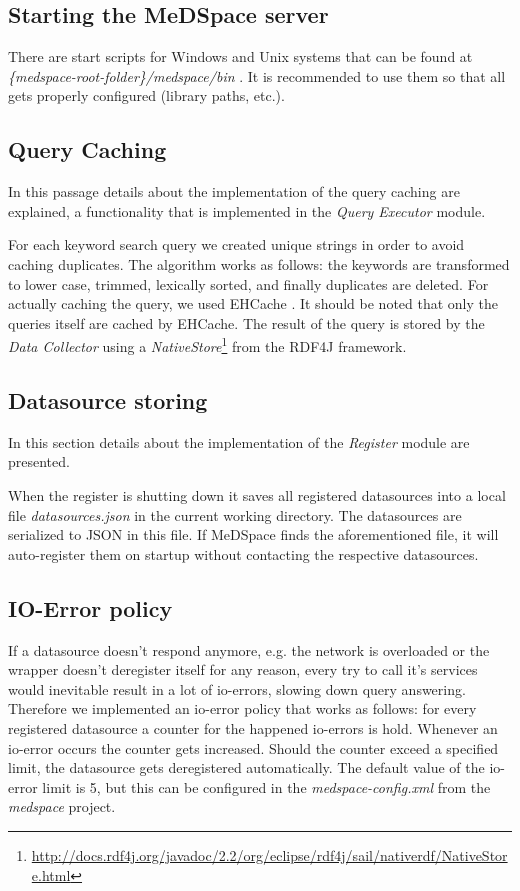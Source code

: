 \subsection{Starting the MeDSpace server}

There are start scripts for Windows and Unix systems that can be found at \\
\emph{\{medspace-root-folder\}/medspace/bin }. It is recommended to use them so that all gets properly configured (library paths, etc.).


\subsection{Query Caching}
In this passage details about the implementation of the query caching are explained, a functionality that is implemented in the \emph{Query Executor} module.

For each keyword search query we created unique strings in order to avoid caching duplicates.
The algorithm works as follows: the keywords are transformed to lower case, trimmed, lexically sorted, and finally duplicates are deleted.
For actually caching the query, we used EHCache \cite{EHCache}. 
It should be noted that only the queries itself are cached by EHCache. The result of the query is stored by the \emph{Data Collector} using a \emph{NativeStore}\footnote{\url{http://docs.rdf4j.org/javadoc/2.2/org/eclipse/rdf4j/sail/nativerdf/NativeStore.html}} from the RDF4J framework.

\subsection{Datasource storing}
In this section details about the implementation of the \emph{Register} module are presented.

When the register is shutting down it saves all registered datasources into a local file \emph{datasources.json} in the current working directory. The datasources are serialized to JSON in this file. If MeDSpace finds the aforementioned file, it will auto-register them on startup without contacting the respective datasources.

\subsection{IO-Error policy}

If a datasource doesn't respond anymore, e.g. the network is overloaded or the wrapper doesn't deregister itself for any reason, every try to call it's services would inevitable result in a lot of io-errors, slowing down query answering. Therefore we implemented an io-error policy that works as follows: for every registered datasource a counter for the happened io-errors is hold. Whenever an io-error occurs the counter gets increased. Should the counter exceed a specified limit, the datasource gets deregistered automatically. The default value of the io-error limit is 5, but this can be configured in the \emph{medspace-config.xml} from the \emph{medspace} project.

